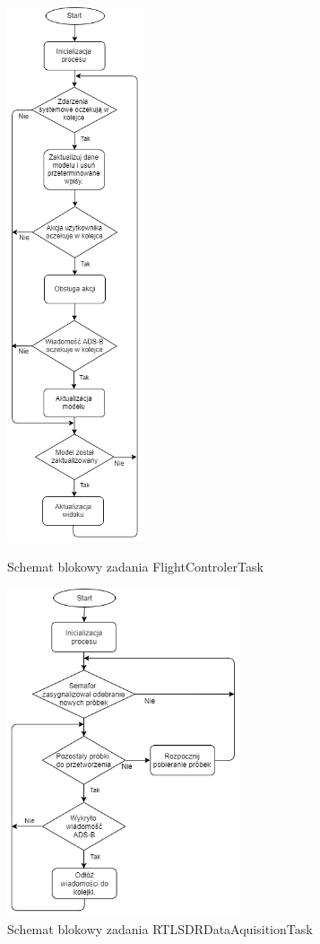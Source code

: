 \documentclass[eng,printmode]{mgr}
\begin{document}
\begin{figure}[htb]
\centering
\begin{minipage}[c]{0.35\linewidth}
\centering
\includegraphics[width=3.99cm]{plots/modelTask.png}
\caption{Schemat blokowy zadania FlightControlerTask}
\end{minipage}
\hfill
\begin{minipage}[c]{0.55\linewidth}
\centering
\vskip 2.5cm
\includegraphics[width=6.85cm]{plots/dataTask.png}
\vskip 3.55cm
\caption{Schemat blokowy zadania RTLSDRDataAquisitionTask}
\end{minipage}
\end{figure}
\newpage
\end{document}
